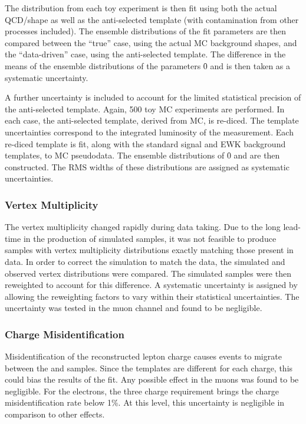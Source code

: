 The \LP distribution from each toy experiment is then fit using both the actual
\ac{QCD}/\gammajets shape as well as the anti-selected template (with
contamination from other processes included). The ensemble distributions of the
fit parameters are then compared between the ``true'' case, using the actual
\ac{MC} background shapes, and the ``data-driven'' case, using the anti-selected
template. The difference in the means of the ensemble distributions of the
parameters \f0 and \fLmfR is then taken as a systematic uncertainty.

A further uncertainty is included to account for the limited statistical
precision of the anti-selected template. Again, 500 toy \ac{MC} experiments are
performed. In each case, the anti-selected template, derived from \ac{MC}, is
re-diced. The template uncertainties correspond to the integrated luminosity of
the measurement. Each re-diced template is fit, along with the standard signal
and \ac{EWK} background templates, to \ac{MC} pseudodata. The ensemble
distributions of \f0 and \fLmfR are then constructed. The \ac{RMS} widths of
these distributions are assigned as systematic uncertainties.

\subsubsection{Vertex Multiplicity}
The vertex multiplicity changed rapidly during data taking. Due to the long
lead-time in the production of simulated samples, it was not feasible to produce
samples with vertex multiplicity distributions exactly matching those present in
data. In order to correct the simulation to match the data, the simulated and
observed vertex distributions were compared. The simulated samples were then
reweighted to account for this difference. A systematic uncertainty is assigned
by allowing the reweighting factors to vary within their statistical
uncertainties. The uncertainty was tested in the muon channel and found to be
negligible.

\subsubsection{Charge Misidentification}
\label{sec:wpol_syst_charge_misid}
Misidentification of the reconstructed lepton charge causes events to migrate
between the \PWp and \PWm samples. Since the templates are different for each
charge, this could bias the results of the fit. Any possible effect in the muons
was found to be negligible. For the electrons, the three charge requirement
brings the charge misidentification rate below 1\%. At this level, this
uncertainty is negligible in comparison to other effects.

